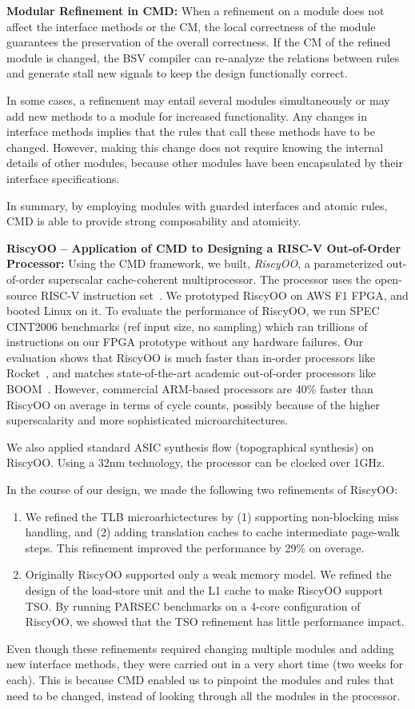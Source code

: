 \documentclass[conference]{IEEEtran}
\begin{document}
\noindent\textbf{Modular Refinement in CMD:}
When a refinement on a module does not affect the interface methods or the CM, the local correctness of the module guarantees the preservation of the overall correctness.
If the CM of the refined module is changed, the BSV compiler can re-analyze the relations between rules and generate stall new signals to keep the design functionally correct.

In some cases, a refinement may entail several modules simultaneously or may add new methods to a module for increased functionality.
Any changes in interface methods implies that the rules that call these methods have to be changed.
However, making this change does not require knowing the internal details of other modules, because other modules have been encapsulated by their interface specifications.

In summary, by employing modules with guarded interfaces and atomic rules, CMD is able to provide strong composability and atomicity.

\noindent\textbf{RiscyOO -- Application of CMD to Designing a RISC-V Out-of-Order Processor:}
Using the CMD framework, we built, \emph{RiscyOO}, a parameterized out-of-order superscalar cache-coherent multiprocessor.
The processor uses the open-source RISC-V instruction set~\cite{riscv}.
We prototyped RiscyOO on AWS F1 FPGA, and booted Linux on it.
To evaluate the performance of RiscyOO, we run SPEC CINT2006 benchmarks (ref input size, no sampling) which ran trillions of instructions on our FPGA prototype without any hardware failures.
Our evaluation shows that RiscyOO is much faster than in-order processors like Rocket~\cite{firesim2017RISCV}, and matches state-of-the-art academic out-of-order processors like BOOM~\cite{kimevaluation}.
However, commercial ARM-based processors are 40\% faster than RiscyOO on average in terms of cycle counts, possibly because of the higher superscalarity and more sophisticated microarchitectures.

We also applied standard ASIC synthesis flow (topographical synthesis) on RiscyOO.
Using a 32nm technology, the processor can be clocked over 1GHz.

In the course of our design, we made the following two refinements of RiscyOO:
\begin{enumerate}
    \item We refined the TLB microarhictectures by (1) supporting non-blocking miss handling, and (2) adding translation caches to cache intermediate page-walk steps.
    This refinement improved the performance by 29\% on overage.
    \item Originally RiscyOO supported only a weak memory model.
    We refined the design of the load-store unit and the L1 cache to make RiscyOO support TSO.
    By running PARSEC benchmarks on a 4-core configuration of RiscyOO, we showed that the TSO refinement has little performance impact.
\end{enumerate}
Even though these refinements required changing multiple modules and adding new interface methods, they were carried out in a very short time (two weeks for each).
This is because CMD enabled us to pinpoint the modules and rules that need to be changed, instead of looking through all the modules in the processor. 
\end{document}
